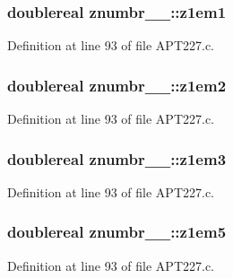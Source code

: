 \subsubsection[{\texorpdfstring{z1em1}{z1em1}}]{\setlength{\rightskip}{0pt plus 5cm}doublereal znumbr\+\_\+\_\+\+::z1em1}\hypertarget{structznumbr__1___a3081550e6fc73b82831002c6e61ead15}{}\label{structznumbr__1___a3081550e6fc73b82831002c6e61ead15}


Definition at line 93 of file A\+P\+T227.\+c.

\subsubsection[{\texorpdfstring{z1em2}{z1em2}}]{\setlength{\rightskip}{0pt plus 5cm}doublereal znumbr\+\_\+\_\+\+::z1em2}\hypertarget{structznumbr__1___a0756e0657a632811278480411a90a7bf}{}\label{structznumbr__1___a0756e0657a632811278480411a90a7bf}


Definition at line 93 of file A\+P\+T227.\+c.

\subsubsection[{\texorpdfstring{z1em3}{z1em3}}]{\setlength{\rightskip}{0pt plus 5cm}doublereal znumbr\+\_\+\_\+\+::z1em3}\hypertarget{structznumbr__1___a8b724cf93058a8560a01e03d57eff0cc}{}\label{structznumbr__1___a8b724cf93058a8560a01e03d57eff0cc}


Definition at line 93 of file A\+P\+T227.\+c.

\subsubsection[{\texorpdfstring{z1em5}{z1em5}}]{\setlength{\rightskip}{0pt plus 5cm}doublereal znumbr\+\_\+\_\+\+::z1em5}\hypertarget{structznumbr__1___a1ce9728876d6335656a45f2243cd0c9f}{}\label{structznumbr__1___a1ce9728876d6335656a45f2243cd0c9f}


Definition at line 93 of file A\+P\+T227.\+c.

